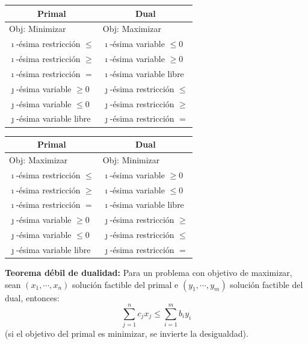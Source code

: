 \documentclass[a4paper,oneside,12pt]{amsart}
\theoremstyle{definition}
\begin{document}

\newpage

   \begin{tabular}{|l|l|} \hline
        \multicolumn{1}{|c|}{Primal} & \multicolumn{1}{c|}{Dual}  \\ \hline
        Obj: Minimizar & Obj: Maximizar \\ \hline
        $\imath$-ésima restricción $\leq$ & $\imath$-ésima variable $\leq 0$ \\
        $\imath$-ésima restricción $\geq$ & $\imath$-ésima variable $\geq 0$ \\
        $\imath$-ésima restricción $=$ & $\imath$-ésima variable libre \\
        $\jmath$-ésima variable $\geq 0$ & $\jmath$-ésima restricción $\leq$ \\
        $\jmath$-ésima variable $\leq 0$ & $\jmath$-ésima restricción $\geq$ \\
        $\jmath$-ésima variable libre & $\jmath$-ésima restricción $=$ \\ \hline
    \end{tabular}
    \begin{tabular}{|l|l|} \hline
        \multicolumn{1}{|c|}{Primal} & \multicolumn{1}{c|}{Dual}  \\ \hline
        Obj: Maximizar & Obj: Minimizar \\ \hline
        $\imath$-ésima restricción $\leq$ & $\imath$-ésima variable $\geq 0$ \\
        $\imath$-ésima restricción $\geq$ & $\imath$-ésima variable $\leq 0$ \\
        $\imath$-ésima restricción $=$ & $\imath$-ésima variable libre \\
        $\jmath$-ésima variable $\geq 0$ & $\jmath$-ésima restricción $\geq$ \\
        $\jmath$-ésima variable $\leq 0$ & $\jmath$-ésima restricción $\leq$ \\
        $\jmath$-ésima variable libre & $\jmath$-ésima restricción $=$ \\ \hline
    \end{tabular}
    \vspace{1cm}

    \textbf{Teorema débil de dualidad:} Para un problema con objetivo de maximizar, sean $(x_1,\cdots,x_n)$ solución
factible del primal e $(y_1,\cdots, y_m)$ solución factible del dual, entonces:
    \[ \displaystyle \sum_{j=1}^n c_jx_j \leq \sum_{i=1}^m b_iy_i\]
    (si el objetivo del primal es minimizar, se invierte la desigualdad).
\end{document}
